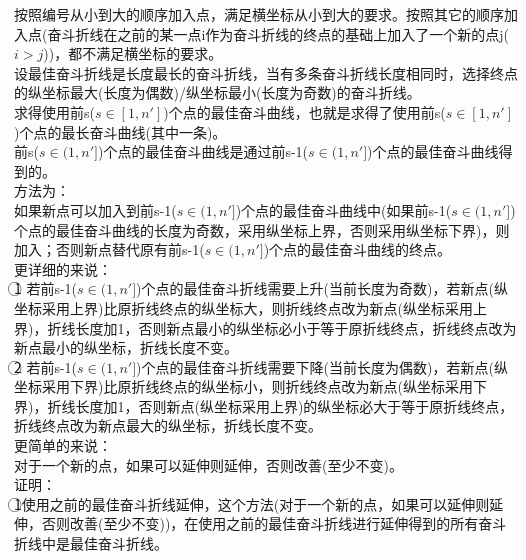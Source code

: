 \documentclass{article}
\begin{document}
		\indent 按照编号从小到大的顺序加入点，满足横坐标从小到大的要求。按照其它的顺序加入点(奋斗折线在之前的某一点i作为奋斗折线的终点的基础上加入了一个新的点j($i>j$))，都不满足横坐标的要求。\\
		
		\indent 设最佳奋斗折线是长度最长的奋斗折线，当有多条奋斗折线长度相同时，选择终点的纵坐标最大(长度为偶数)/纵坐标最小(长度为奇数)的奋斗折线。\\
		
		\indent 求得使用前s($s \in [1,n']$)个点的最佳奋斗曲线，也就是求得了使用前s($s \in [1,n']$)个点的最长奋斗曲线(其中一条)。\\
		
		\indent 前s($s \in (1,n']$)个点的最佳奋斗曲线是通过前s-1($s \in (1,n']$)个点的最佳奋斗曲线得到的。\\

		\indent 方法为：\\
		
		\indent 如果新点可以加入到前s-1($s \in (1,n']$)个点的最佳奋斗曲线中(如果前s-1($s \in (1,n']$)个点的最佳奋斗曲线的长度为奇数，采用纵坐标上界，否则采用纵坐标下界)，则加入；否则新点替代原有前s-1($s \in (1,n']$)个点的最佳奋斗曲线的终点。\\
		
		\indent 更详细的来说：\\
		
		\indent \textcircled{1} 若前s-1($s \in (1,n']$)个点的最佳奋斗折线需要上升(当前长度为奇数)，若新点(纵坐标采用上界)比原折线终点的纵坐标大，则折线终点改为新点(纵坐标采用上界)，折线长度加1，否则新点最小的纵坐标必小于等于原折线终点，折线终点改为新点最小的纵坐标，折线长度不变。\\
		
		\indent \textcircled{2} 若前s-1($s \in (1,n']$)个点的最佳奋斗折线需要下降(当前长度为偶数)，若新点(纵坐标采用下界)比原折线终点的纵坐标小，则折线终点改为新点(纵坐标采用下界)，折线长度加1，否则新点(纵坐标采用上界)的纵坐标必大于等于原折线终点，折线终点改为新点最大的纵坐标，折线长度不变。\\
		
		\indent 更简单的来说：\\
		
		\indent 对于一个新的点，如果可以延伸则延伸，否则改善(至少不变)。\\
		
		\indent 证明：\\
		
		\indent \textcircled{1}使用之前的最佳奋斗折线延伸，这个方法(对于一个新的点，如果可以延伸则延伸，否则改善(至少不变))，在使用之前的最佳奋斗折线进行延伸得到的所有奋斗折线中是最佳奋斗折线。\\
		
\end{document}
